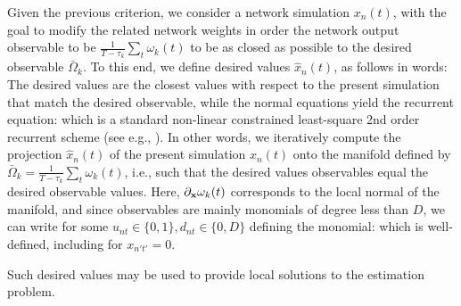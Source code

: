 Given the previous criterion, we consider a network simulation $x_n(t)$, with the goal to modify the related network weights in order the network output observable to be $\frac{1}{T-\tau_k} \sum_t \omega_k(t)$ to be as closed as possible to the desired observable $\bar{\Omega}_k$. To this end, we define desired values $\hat{x}_n(t)$, as follows
in words: The desired values are the closest values with respect to the present simulation that match the desired observable, while the normal equations yield the recurrent equation:
which is a standard non-linear constrained least-square 2nd order recurrent scheme (see e.g., \cite{vieville:inria-00074888}). In other words, we iteratively compute the projection $\hat{x}_n(t)$ of the present simulation $x_n(t)$ onto the manifold defined by $\bar{\Omega}_{k} = \frac{1}{T-\tau_k} \sum_t \omega_k(t)$, i.e., such that the desired values observables equal the desired observable values. Here, $\partial_{\bf x} \omega_{k}(t)$ corresponds to the local normal of the manifold, and since observables are mainly monomials of degree less than $D$, we can write for some $u_{nt} \in \{0, 1\}, d_{nt} \in \{0, D\}$ defining the monomial:
which is well-defined, including for $x_{n't'} = 0$.

Such desired values may be used to provide local solutions to the estimation problem.


